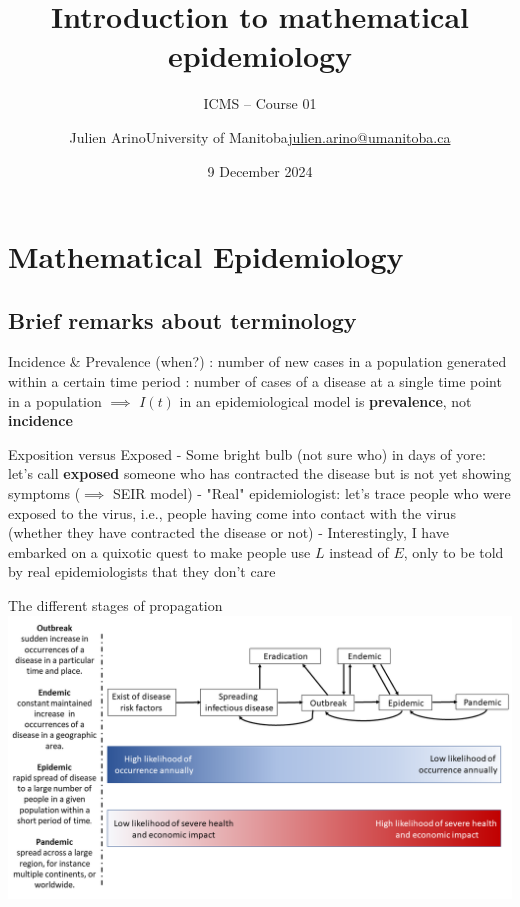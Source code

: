 \documentclass[aspectratio=169]{beamer}\usepackage[]{graphicx}\usepackage[]{xcolor}
\title{Introduction to mathematical epidemiology}
\subtitle{ICMS -- Course 01}
\date{9 December 2024}
\author{\texorpdfstring{Julien Arino\newline University of Manitoba\newline\url{julien.arino@umanitoba.ca}}{Julien Arino}}
\begin{document}


\section{Mathematical Epidemiology}

\subsection{Brief remarks about terminology}

\begin{frame}{Incidence \& Prevalence (when?)}
: number of new cases in a population generated within a certain time period
\vfill
{}: number of cases of a disease at a single time point in a population
\vfill
$\implies$ $I(t)$ in an epidemiological model is \textbf{prevalence}, not \textbf{incidence}
\end{frame}

\begin{frame}{Exposition versus Exposed}
- Some bright bulb (not sure who) in days of yore: let's call \textbf{exposed} someone who has contracted the disease but is not yet showing symptoms ($\implies$ SEIR model)
\vfill
- "Real" epidemiologist: let's trace people who were exposed to the virus, i.e., people having come into contact with the virus (whether they have contracted the disease or not)
\vfill
- Interestingly, I have embarked on a quixotic quest to make people use $L$ instead of $E$, only to be told by real epidemiologists that they don't care \code{:)}
\end{frame}


\begin{frame}{The different stages of propagation}
        \includegraphics[width=\textwidth]{FIGS/Difference_between_outbreak,_endemic,_epidemic_and_pandemic-en.png}
\end{frame}
        
\end{document}
